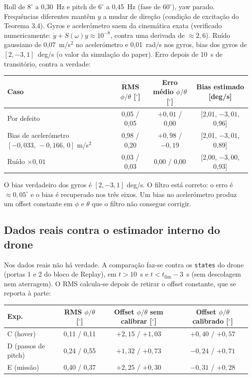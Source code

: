 \documentclass[10pt,a4paper]{article}
\newcommand{\code}[1]{\texttt{#1}}
\newcommand{\Sk}{S}          %
\begin{document}
Roll de $8^\circ$ a 0,30~Hz e pitch de $6^\circ$ a 0,45~Hz (fase de $60^\circ$), yaw parado.
Frequ\^encias diferentes mant\^em $y$ a mudar de dire\c{c}\~ao (condi\c{c}\~ao de excita\c{c}\~ao do Teorema 3.4).
Gyros e aceler\'ometro saem da cinem\'atica exata (verificado numericamente: $\dot y + \Sk(\omega)y \approx 10^{-8}$, contra uma derivada de $\approx 2{,}6$).
Ru\'ido gaussiano de 0,07~m/s$^2$ no aceler\'ometro e 0,01~rad/s nos gyros, bias dos gyros de $[2,-3,1]$~deg/s (o valor da simula\c{c}\~ao do paper).
Erro depois de 10~s de transit\'orio, contra a verdade:

\begin{center}
\small
\begin{tabular}{@{}lccc@{}}
\toprule
Caso & RMS $\phi/\theta$ [$^\circ$] & Erro m\'edio $\phi/\theta$ [$^\circ$] & Bias estimado [deg/s] \\
\midrule
Por defeito & 0,05 / 0,05 & $+0{,}01$ / 0,00 & [2,01, $-3{,}01$, 0,96] \\
Bias de aceler\'ometro $[-0{,}033,\,-0{,}166,\,0]$ m/s$^2$ & 0,98 / 0,20 & $+0{,}98$ / $-0{,}19$ & [2,01, $-3{,}01$, 0,89] \\
Ru\'ido $\times 0{,}01$ & 0,03 / 0,03 & 0,00 / 0,00 & [2,00, $-3{,}00$, 0,93] \\
\bottomrule
\end{tabular}
\end{center}

O bias verdadeiro dos gyros \'e $[2,-3,1]$ deg/s.
O filtro est\'a correto: o erro \'e $\approx 0{,}05^\circ$ e o bias \'e recuperado nos tr\^es eixos.
Um bias no aceler\'ometro produz um offset constante em $\phi$ e $\theta$ que o filtro n\~ao consegue corrigir.

\subsection{Dados reais contra o estimador interno do drone}

Nos dados reais n\~ao h\'a verdade.
A compara\c{c}\~ao faz-se contra os \code{states} do drone (portas 1 e 2 do bloco de Replay), em $t > 10$~s e $t < t_{\text{fim}} - 3$~s (sem descolagem nem aterragem).
O RMS calcula-se depois de retirar o offset constante, que se reporta \`a parte:

\begin{center}
\small
\begin{tabular}{@{}lccc@{}}
\toprule
Exp. & RMS $\phi/\theta$ [$^\circ$] & Offset $\phi/\theta$ sem calibrar [$^\circ$] & Offset $\phi/\theta$ calibrado [$^\circ$] \\
\midrule
C (hover)           & 0,11 / 0,11 & $+2{,}15$ / $+1{,}03$ & $+0{,}40$ / $+0{,}57$ \\
D (passos de pitch) & 0,24 / 0,55 & $+1{,}32$ / $+0{,}73$ & $-0{,}24$ / $+0{,}71$ \\
E (miss\~ao)        & 0,40 / 0,37 & $+2{,}25$ / $+0{,}30$ & $-0{,}31$ / $+0{,}28$ \\
\bottomrule
\end{tabular}
\end{center}
\end{document}
